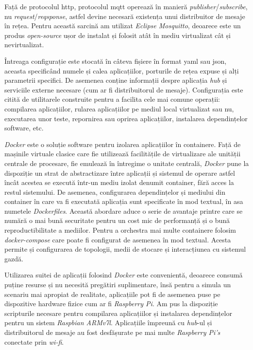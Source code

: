
Față de protocolul \acrshort{http}, protocolul \acrshort{mqtt} operează în manieră \textit{publisher}/\textit{subscribe}, nu \textit{request}/\textit{reqsponse}, astfel devine necesară existența unui distribuitor de mesaje în rețea. Pentru această sarcină am utilizat \textit{Eclipse Mosquitto}, deoarece este un produs \textit{open-source} ușor de instalat și folosit atât în mediu virtualizat cât și nevirtualizat.

Întreaga configurație este stocată în câteva fișiere în format \acrfull{yaml} sau \acrshort{json}, aceasta specificând numele și calea aplicațiilor, porturile de rețea expuse și alți parametrii specifici. De asemenea conține informații despre aplicația \textit{hub} și serviciile externe necesare (cum ar fi distribuitorul de mesaje). Configurația este citită de utilitarele construite pentru a facilita cele mai comune operații: compilarea aplicațiilor, rularea aplicațiilor pe mediul local virtualizat sau nu, executarea unor teste, repornirea sau oprirea aplicațiilor, instalarea dependințelor software, etc.



\textit{Docker} este o soluție software pentru izolarea aplicațiilor în containere. Față de mașinile virtuale clasice care fie utilizează facilitățile de virtualizare ale unității centrale de procesare, fie emulează în întregime o unitate centrală, \textit{Docker} pune la dispoziție un strat de abstractizare între aplicații și sistemul de operare astfel încât acestea se execută într-un mediu izolat denumit container, fără acces la restul sistemului. De asemenea, configurarea dependințelor și mediului din container în care va fi executată aplicația sunt specificate în mod textual, în asa numetele \textit{Dockerfiles}. Această abordare aduce o serie de avantaje printre care se numără o mai bună securitate pentru un cost mic de performanță și o bună reproductibilitate a mediilor. Pentru a orchestra mai multe containere folosim \textit{docker-compose} care poate fi configurat de asemenea în mod textual. Acesta permite și configurarea de topologii, medii de stocare și interacțiunea cu sistemul gazdă.

Utilizarea suitei de aplicații folosind \textit{Docker} este convenientă, deoarece consumă puține resurse și nu necesită pregătiri suplimentare, însă pentru a simula un scenariu mai apropiat de realitate, aplicațiile pot fi de asemenea puse pe dispozitive hardware fizice cum ar fi \textit{Raspberry Pi}. Am pus la dispoziție scripturile necesare pentru compilarea aplicațiilor și instalarea dependințelor pentru un sistem \textit{Raspbian ARMv7l}. Aplicațiile împreună cu \textit{hub}-ul și distribuitorul de mesaje au fost desfășurate pe mai multe \textit{Raspberry Pi's} conectate prin \textit{wi-fi}.

